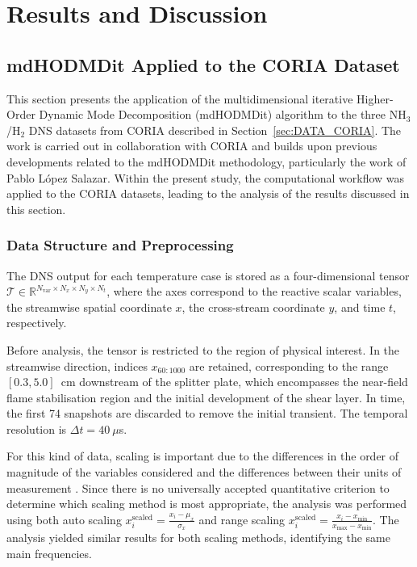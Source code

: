 \section{Results and Discussion}
\label{sec:results}

\subsection{mdHODMDit Applied to the CORIA Dataset} 
\label{sec:results_coria}
This section presents the application of the multidimensional iterative Higher-Order Dynamic Mode Decomposition (mdHODMDit) algorithm to the three NH$_3$/H$_2$ DNS datasets from CORIA described in Section~\ref{sec:DATA_CORIA}. The work is carried out in collaboration with CORIA and builds upon previous developments related to the mdHODMDit methodology, particularly the work of Pablo López Salazar. Within the present study, the computational workflow was applied to the CORIA datasets, leading to the analysis of the results discussed in this section.

\subsubsection{Data Structure and Preprocessing}
\label{sec:coria_preprocessing}

The DNS output for each temperature case is stored as a four-dimensional tensor $\mathcal{T} \in \mathbb{R}^{N_{\mathrm{var}} \times N_x \times N_y \times N_t}$, where the axes correspond to the reactive scalar variables, the streamwise spatial coordinate $x$, the cross-stream coordinate $y$, and time $t$, respectively.

Before analysis, the tensor is restricted to the region of physical interest. In the streamwise direction, indices $x_{60:1000}$ are retained, corresponding to the range $[0.3, 5.0]$~cm downstream of the splitter plate, which encompasses the near-field flame stabilisation region and the initial development of the shear layer. In time, the first 74 snapshots are discarded to remove the initial transient. The temporal resolution is $\Delta t = 40~\mu$s.

For this kind of data, scaling is important due to the differences in the order of magnitude of the variables considered and the differences between their units of measurement \cite{corrochano2023higher, parente2013principal}. Since there is no universally accepted quantitative criterion to determine which scaling method is most appropriate, the analysis was performed using both auto scaling $x_{i}^{\text{scaled}} = \frac{x_i - \mu_x}{\sigma_x}$ and range scaling $x_{i}^{\text{scaled}} = \frac{x_i - x_{\min}}{x_{\max} - x_{\min}}$. The analysis yielded similar results for both scaling methods, identifying the same main frequencies.

